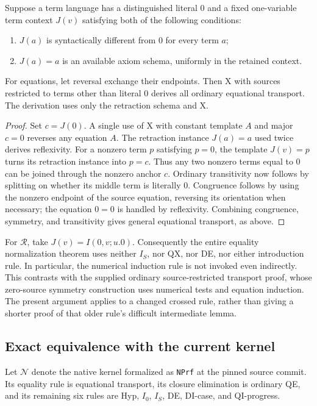 \begin{proposition}\label{rev:abstract}
Suppose a term language has a distinguished literal $0$ and a fixed
one-variable term context $J(v)$ satisfying both of the following
conditions:
\begin{enumerate}
\item $J(a)$ is syntactically different from $0$ for every term $a$;
\item $J(a)=a$ is an available axiom schema, uniformly in the retained
context.
\end{enumerate}
For equations, let reversal exchange their endpoints. Then X with
sources restricted to terms other than literal $0$ derives all ordinary
equational transport. The derivation uses only the retraction schema
and X.
\end{proposition}
\begin{proof}
Set $c=J(0)$. A single use of X with constant template $A$ and major
$c=0$ reverses any equation $A$. The retraction instance $J(a)=a$ used
twice derives reflexivity. For a nonzero term $p$ satisfying $p=0$,
the template $J(v)=p$ turns its retraction instance into $p=c$.
Thus any two nonzero terms equal to $0$ can be joined through the
nonzero anchor $c$. Ordinary transitivity now follows by splitting on
whether its middle term is literally $0$. Congruence follows by using
the nonzero endpoint of the source equation, reversing its orientation
when necessary; the equation $0=0$ is handled by reflexivity. Combining
congruence, symmetry, and transitivity gives general equational
transport, as above.
\end{proof}

For $\mathcal R$, take $J(v)=I(0,v;u.0)$. Consequently the entire
equality normalization theorem uses neither $I_S$, nor QX, nor DE,
nor either introduction rule. In particular, the numerical induction
rule is not invoked even indirectly. This contrasts with the supplied
ordinary source-restricted transport proof, whose zero-source symmetry
construction uses numerical tests and equation induction. The present
argument applies to a changed crossed rule, rather than giving a
shorter proof of that older rule's difficult intermediate lemma.

\subsection{Exact equivalence with the current kernel}

Let $\mathcal N$ denote the native kernel formalized as
\texttt{NPrf} at the pinned source commit. Its equality rule is
equational transport, its closure elimination is ordinary QE, and its
remaining six rules are Hyp, $I_0$, $I_S$, DE, DI-case, and QI-progress.

